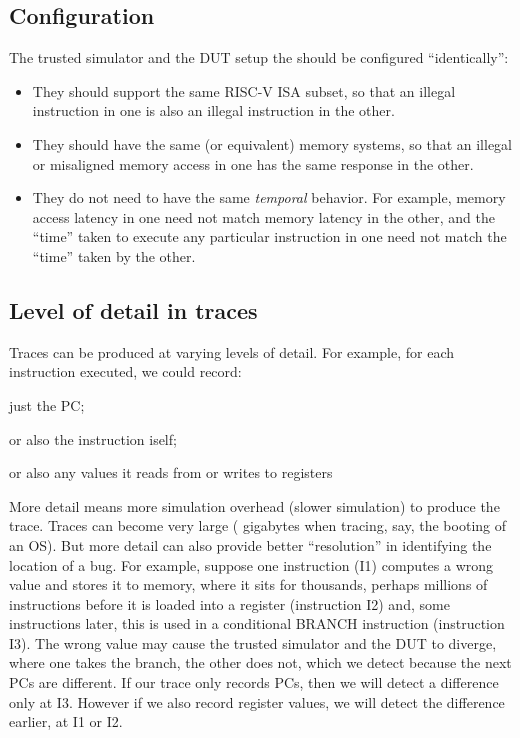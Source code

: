 
\subsection{Configuration}

The trusted simulator and the DUT setup the should be configured
``identically'':

\begin{itemize}
 \item They should support the same RISC-V ISA subset, so that an
       illegal instruction in one is also an illegal instruction in the
       other.  

 \item They should have the same (or equivalent) memory systems, so
       that an illegal or misaligned memory access in one has the same
       response in the other.

 \item They do not need to have the same \emph{temporal} behavior.
       For example, memory access latency in one need not match memory
       latency in the other, and the ``time'' taken to execute any
       particular instruction in one need not match the ``time'' taken
       by the other.

\end{itemize}


\subsection{Level of detail in traces}

Traces can be produced at varying levels of detail.  For example, for
each instruction executed, we could record:

\begin{tightlist}
 \item just the PC;
 \item or also the instruction iself;
 \item or also any values it reads from or writes to registers
\end{tightlist}

More detail means more simulation overhead (slower simulation) to
produce the trace.  Traces can become very large ({\eg} gigabytes when
tracing, say, the booting of an OS).  But more detail can also provide
better ``resolution'' in identifying the location of a bug.  For
example, suppose one instruction (I1) computes a wrong value and
stores it to memory, where it sits for thousands, perhaps millions of
instructions before it is loaded into a register (instruction I2) and,
some instructions later, this is used in a conditional BRANCH
instruction (instruction I3).  The wrong value may cause the trusted
simulator and the DUT to diverge, where one takes the branch, the
other does not, which we detect because the next PCs are different.
If our trace only records PCs, then we will detect a difference only
at I3. However if we also record register values, we will detect the
difference earlier, at I1 or I2.

